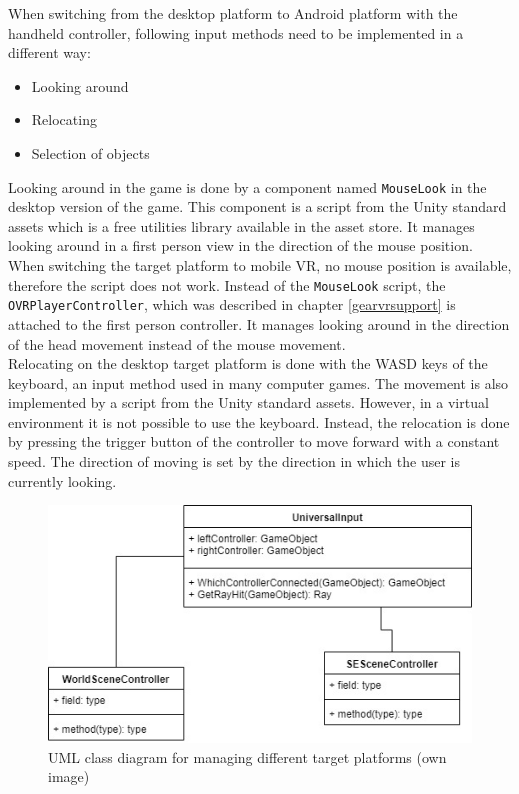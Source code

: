 \newpage
When switching from the desktop platform to Android platform with the handheld controller, following input methods need to be implemented in a different way:
\begin{itemize}
\item Looking around
\item Relocating
\item Selection of objects
\end{itemize}
Looking around in the game is done by a component named \texttt{MouseLook} in the desktop version of the game. This component is a script from the Unity standard assets which is a free utilities library available in the asset store. It manages looking around in a first person view in the direction of the mouse position. When switching the target platform to mobile VR, no mouse position is available, therefore the script does not work. Instead of the \texttt{MouseLook} script, the \texttt{OVRPlayerController}, which was described in chapter \ref{gearvrsupport} is attached to the first person controller. It manages looking around in the direction of the head movement instead of the mouse movement.\\
Relocating on the desktop target platform is done with the WASD keys of the keyboard, an input method used in many computer games. The movement is also implemented by a script from the Unity standard assets. However, in a virtual environment it is not possible to use the keyboard. Instead, the relocation is done by pressing the trigger button of the controller to move forward with a constant speed. The direction of moving is set by the direction in which the user is currently looking.\\
\begin{figure}[h!]
  \includegraphics[width=13cm]{kapitel/uml1.jpg}
  \centering
  \caption{UML class diagram for managing different target platforms (own image)}
  \label{fig:uml-universalinput}
\end{figure}
